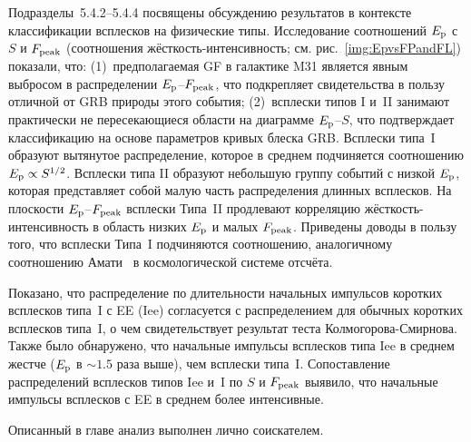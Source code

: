 Подразделы~5.4.2--5.4.4 посвящены обсуждению результатов в контексте классификации всплесков на физические типы.
Исследование соотношений $E_{\mathrm{p}}$ с $S$ и $F_{\mathrm{peak}}$
(соотношения жёсткость-интенсивность; см. рис.~\ref{img:EpvsFPandFL}) показали, что:
(1)~предполагаемая GF в галактике M31 является явным выбросом в распределении $E_{\mathrm{p}}$--$F_{\mathrm{peak}}$, 
что подкрепляет свидетельства в пользу отличной от GRB природы этого события;
(2)~всплески типов I и~II занимают практически не пересекающиеся области на диаграмме $E_{\mathrm{p}}$--$S$,
что подтверждает классификацию на основе параметров кривых блеска GRB.
Всплески типа~I образуют вытянутое распределение, которое в среднем подчиняется 
соотношению $E_{\mathrm{p}} \propto S^{1/2}$. Всплески типа II образуют небольшую группу событий
с низкой $E_{\mathrm{p}}$, которая представляет собой малую часть распределения длинных всплесков.
На плоскости $E_{\mathrm{p}}$--$F_{\mathrm{peak}}$ всплески Типа~II продлевают корреляцию 
жёсткость-интенсивность в область низких $E_{\mathrm{p}}$ и малых $F_{\mathrm{peak}}$.
Приведены доводы в пользу того, что всплески Типа~I подчиняются 
соотношению, аналогичному соотношению Амати~\citep{Amati_2002AandA} в космологической системе отсчёта.

Показано, что распределение по длительности начальных импульсов коротких всплесков 
типа~I с EE (Iee) согласуется с распределением для обычных коротких всплесков типа~I, 
о чем свидетельствует результат теста Колмогорова-Смирнова. 
Также было обнаружено, что начальные импульсы всплесков типа Iee в среднем 
жестче ($E_{\mathrm{p}}$ в $\sim 1.5$ раза выше), чем всплески типа~I. 
Сопоставление распределений 
всплесков типов Iee и~I по $S$ и $F_{\mathrm{peak}}$ выявило, что начальные импульсы 
всплесков с EE в среднем более интенсивные. 

Описанный в главе анализ выполнен лично соискателем.

